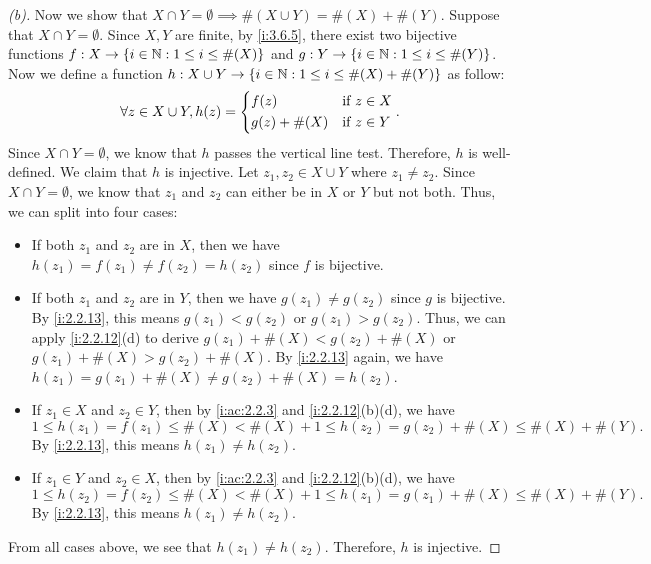 \begin{proof}[(b)]
  Now we show that \(X \cap Y = \emptyset \implies \#(X \cup Y) = \#(X) + \#(Y)\).
  Suppose that \(X \cap Y = \emptyset\).
  Since \(X, Y\) are finite, by \cref{i:3.6.5}, there exist two bijective functions \(f : X \to \left\lbrace i \in \mathbb{N} : 1 \leq i \leq \#(X)\right\rbrace\) and \(g : Y \to \left\lbrace i \in \mathbb{N} : 1 \leq i \leq \#(Y)\right\rbrace\).
  Now we define a function \(h : X \cup Y \to \left\lbrace i \in \mathbb{N} : 1 \leq i \leq \#(X) + \#(Y)\right\rbrace\) as follow:
  \[
    \forall z \in X \cup Y, h(z) = \begin{dcases}
      f(z)         & \text{if } z \in X \\
      g(z) + \#(X) & \text{if } z \in Y
    \end{dcases}.
  \]
  Since \(X \cap Y = \emptyset\), we know that \(h\) passes the vertical line test.
  Therefore, \(h\) is well-defined.
  We claim that \(h\) is injective.
  Let \(z_1, z_2 \in X \cup Y\) where \(z_1 \neq z_2\).
  Since \(X \cap Y = \emptyset\), we know that \(z_1\) and \(z_2\) can either be in \(X\) or \(Y\) but not both.
  Thus, we can split into four cases:
  \begin{itemize}
    \item If both \(z_1\) and \(z_2\) are in \(X\), then we have \(h(z_1) = f(z_1) \neq f(z_2) = h(z_2)\) since \(f\) is bijective.
    \item If both \(z_1\) and \(z_2\) are in \(Y\), then we have \(g(z_1) \neq g(z_2)\) since \(g\) is bijective.
          By \cref{i:2.2.13}, this means \(g(z_1) < g(z_2)\) or \(g(z_1) > g(z_2)\).
          Thus, we can apply \cref{i:2.2.12}(d) to derive \(g(z_1) + \#(X) < g(z_2) + \#(X)\) or \(g(z_1) + \#(X) > g(z_2) + \#(X)\).
          By \cref{i:2.2.13} again, we have \(h(z_1) = g(z_1) + \#(X) \neq g(z_2) + \#(X) = h(z_2)\).
    \item If \(z_1 \in X\) and \(z_2 \in Y\), then by \cref{i:ac:2.2.3} and \cref{i:2.2.12}(b)(d), we have
          \[
            1 \leq h(z_1) = f(z_1) \leq \#(X) < \#(X) + 1 \leq h(z_2) = g(z_2) + \#(X) \leq \#(X) + \#(Y).
          \]
          By \cref{i:2.2.13}, this means \(h(z_1) \neq h(z_2)\).
    \item If \(z_1 \in Y\) and \(z_2 \in X\), then by \cref{i:ac:2.2.3} and \cref{i:2.2.12}(b)(d), we have
          \[
            1 \leq h(z_2) = f(z_2) \leq \#(X) < \#(X) + 1 \leq h(z_1) = g(z_1) + \#(X) \leq \#(X) + \#(Y).
          \]
          By \cref{i:2.2.13}, this means \(h(z_1) \neq h(z_2)\).
  \end{itemize}
  From all cases above, we see that \(h(z_1) \neq h(z_2)\).
  Therefore, \(h\) is injective.

\end{proof}

